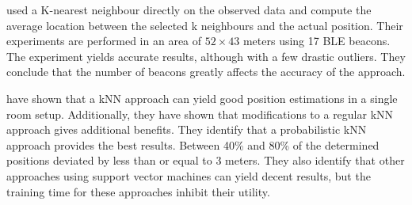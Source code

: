 \citeauthor{improving_indoor_localization} \cite{improving_indoor_localization} used a K-nearest neighbour directly on the observed data and compute the average location between the selected k neighbours and the actual position. 
Their experiments are performed in an area of $52\times43$ meters using 17 BLE beacons.
The experiment yields accurate results, although with a few drastic outliers. 
They conclude that the number of beacons greatly affects the accuracy of the approach.

\citeauthor{ble_kneares_neural}\cite{ble_kneares_neural} have shown that a kNN approach can yield good position estimations in a single room setup. 
Additionally, they have shown that modifications to a regular kNN approach gives additional benefits. 
They identify that a probabilistic kNN approach provides the best results. 
Between 40\% and 80\% of the determined positions deviated by less than or equal to 3 meters. 
They also identify that other approaches using support vector machines can yield decent results, but the training time for these approaches inhibit their utility.